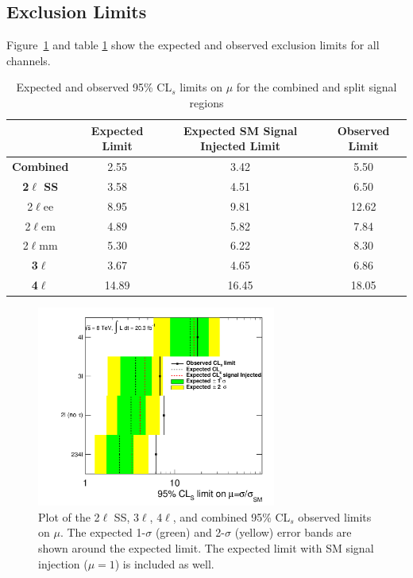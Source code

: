 \subsection{Exclusion Limits}

Figure~\ref{figure:results_limits} and table \ref{table:limits} show the expected and observed exclusion limits for all channels.


\begin{table}[h!]
\centering
\caption{Expected and observed 95\% CL$_s$ limits on $\mu$ for the combined and split signal regions}
\begin{tabular}{|c|c|c|c|}
\hline
& Expected Limit & Expected SM Signal Injected Limit  & Observed Limit\\ 
\hline
\textbf{Combined} & 2.55& 3.42& 5.50\\
\hline 
\textbf{2$\ell$ SS} & 3.58 &4.51 & 6.50 \\  
\hline
2$\ell$ee &8.95 &9.81 &12.62\\   
2$\ell$em &4.89 &5.82 &7.84\\
2$\ell$mm &5.30 &6.22 &8.30\\
\hline
\textbf{3$\ell$}  &3.67 &4.65 &6.86\\  
\hline
\textbf{4$\ell$}  &14.89 &16.45 &18.05\\  
\hline
\end{tabular}
\label{table:limits}
\end{table}

\begin{figure}[htbp]
\begin{center}
\includegraphics[width=0.7\textwidth]{figs/results/Limits_Obs.pdf}
\caption{Plot of the 2$\ell$ SS, 3$\ell$, 4$\ell$, and combined 95\% CL$_{s}$ observed limits on $\mu$. The expected 1-$\sigma$ (green) and 2-$\sigma$ (yellow) error bands are shown around
the expected limit. The expected limit with SM signal injection ($\mu=1$) is included as well.}
\label{figure:results_limits}
\end{center}
\end{figure}



